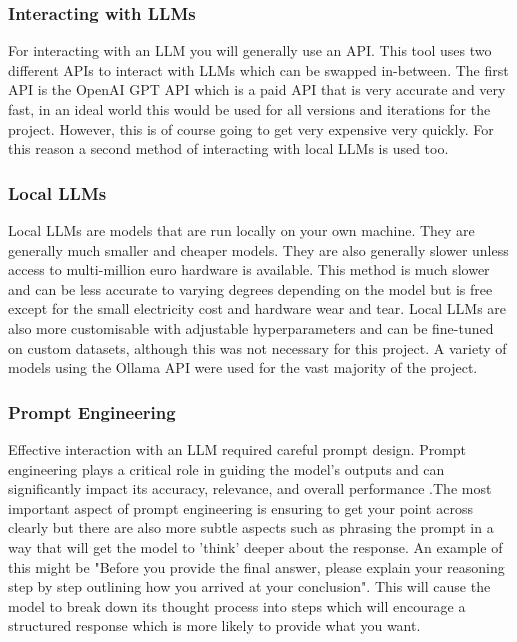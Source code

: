 \documentclass[12pt]{extarticle}
\begin{document}
\subsubsection{Interacting with LLMs}

For interacting with an LLM you will generally use an API. This tool uses two different APIs to interact with LLMs which can be swapped in-between. The first API is the OpenAI GPT API which is a paid API that is very accurate and very fast, in an ideal world this would be used for all versions and iterations for the project. However, this is of course going to get very expensive very quickly. For this reason a second method of interacting with local LLMs is used too.

\subsubsection{Local LLMs}

Local LLMs are models that are run locally on your own machine. They are generally much smaller and cheaper models. They are also generally slower unless access to multi-million euro hardware is available. This method is much slower and can be less accurate to varying degrees depending on the model but is free except for the small electricity cost and hardware wear and tear. Local LLMs are also more customisable with adjustable hyperparameters and can be fine-tuned on custom datasets, although this was not necessary for this project. A variety of models using the Ollama API were used for the vast majority of the project.

\subsubsection{Prompt Engineering}

Effective interaction with an LLM required careful prompt design. Prompt engineering plays a critical role in guiding the model's outputs and can significantly impact its accuracy, relevance, and overall performance .The most important aspect of prompt engineering is ensuring to get your point across clearly but there are also more subtle aspects such as phrasing the prompt in a way that will get the model to 'think' deeper about the response. An example of this might be "Before you provide the final answer, please explain your reasoning step by step outlining how you arrived at your conclusion". This will cause the model to break down its thought process into steps which will encourage a structured response which is more likely to provide what you want.
\end{document}
